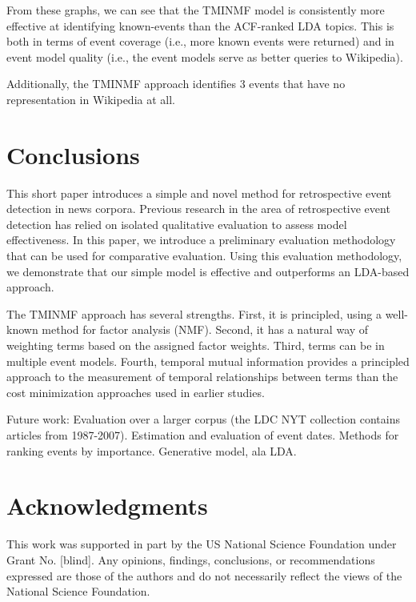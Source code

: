 \documentclass{sig-alternate}
\begin{document}
From these graphs, we can see that the TMINMF model is consistently more effective at identifying known-events than the ACF-ranked LDA topics. This is both in terms of event coverage (i.e., more known events were returned) and in event model quality (i.e., the event models serve as better queries to Wikipedia).  

Additionally, the TMINMF approach identifies 3 events that have no representation in Wikipedia at all.



\section{Conclusions}

This short paper introduces a simple and novel method for retrospective event detection in news corpora. Previous research in the area of retrospective event detection has relied on isolated qualitative evaluation to assess model effectiveness. In this paper, we introduce a preliminary evaluation methodology that can be used for comparative evaluation. Using this evaluation methodology, we demonstrate that our simple model is effective and outperforms an LDA-based approach. 

The TMINMF approach has several strengths. First, it is principled, using a well-known method for factor analysis (NMF). Second, it has a natural way of weighting terms based on the assigned factor weights.  Third, terms can be in multiple event models.  Fourth, temporal mutual information provides a principled approach to the measurement of temporal relationships between terms than the cost minimization approaches used in earlier studies.

Future work: Evaluation over a larger corpus (the LDC NYT collection contains articles from 1987-2007). Estimation and evaluation of event dates. Methods for ranking events by importance. Generative model, ala LDA.


\section{Acknowledgments}
This work was supported in part by the US National Science Foundation under Grant No. [blind]. Any opinions, findings, conclusions, or recommendations expressed are those of the authors and do not necessarily reflect the views of the National Science Foundation.



  
\end{document}
